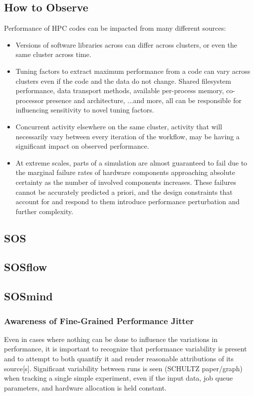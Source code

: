 \subsection{How to Observe}
Performance of HPC codes can be impacted from many different sources:
\begin{itemize}
    \item Versions of software libraries across can differ across
      clusters, or even the same cluster across time.
    \item Tuning factors to extract maximum performance from a code
      can vary across clusters even if the code and the data do not
      change. Shared filesystem performance, data transport methods,
      available per-process memory, co-processor presence and
      architecture, ...and more, all can be responsible for
      influencing sensitivity to novel tuning factors.
    \item Concurrent activity elsewhere on the same cluster, activity
      that will necessarily vary between every iteration of the
      workflow, may be having a significant impact on observed
      performance.
    \item At extreme scales, parts of a simulation are almost
      guaranteed to fail due to the marginal failure rates of hardware
      components approaching absolute certainty as the number of
      involved components increases. These failures cannot be
      accurately predicted a priori, and the design constraints that
      account for and respond to them introduce performance
      perturbation and further complexity.
\end{itemize}

\subsection{SOS}
\subsection{SOSflow}
\subsection{SOSmind}



\subsubsection{Awareness of Fine-Grained Performance Jitter}
  Even in cases where
nothing can be done to influence the variations in performance, it is
important to recognize that performance variability is present and to
attempt to both quantify it and render reasonable attributions of its
source[s]. Significant variability between runs is seen (SCHULTZ
paper/graph) when tracking a single simple experiment, even if the
input data, job queue parameters, and hardware allocation is held
constant.


